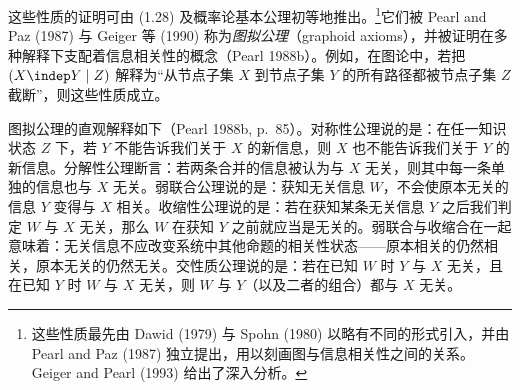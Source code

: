 这些性质的证明可由 \textup{(1.28)} 及概率论基本公理初等地推出。\footnote{这些性质最先由 Dawid (1979) 与 Spohn (1980) 以略有不同的形式引入，并由 Pearl and Paz (1987) 独立提出，用以刻画图与信息相关性之间的关系。Geiger and Pearl (1993) 给出了深入分析。}它们被 Pearl and Paz (1987) 与 Geiger 等 (1990) 称为\emph{图拟公理}（graphoid axioms），并被证明在多种解释下支配着信息相关性的概念（Pearl 1988b）。例如，在图论中，若把 $(X\indep Y\mid Z)$ 解释为“从节点子集 $X$ 到节点子集 $Y$ 的所有路径都被节点子集 $Z$ 截断”，则这些性质成立。

图拟公理的直观解释如下（Pearl 1988b, p.~85）。对称性公理说的是：在任一知识状态 $Z$ 下，若 $Y$ 不能告诉我们关于 $X$ 的新信息，则 $X$ 也不能告诉我们关于 $Y$ 的新信息。分解性公理断言：若两条合并的信息被认为与 $X$ 无关，则其中每一条单独的信息也与 $X$ 无关。弱联合公理说的是：获知无关信息 $W$，不会使原本无关的信息 $Y$ 变得与 $X$ 相关。收缩性公理说的是：若在获知某条无关信息 $Y$ 之后我们判定 $W$ 与 $X$ 无关，那么 $W$ 在获知 $Y$ 之前就应当是无关的。弱联合与收缩合在一起意味着：无关信息不应改变系统中其他命题的相关性状态——原本相关的仍然相关，原本无关的仍然无关。交性质公理说的是：若在已知 $W$ 时 $Y$ 与 $X$ 无关，且在已知 $Y$ 时 $W$ 与 $X$ 无关，则 $W$ 与 $Y$（以及二者的组合）都与 $X$ 无关。
